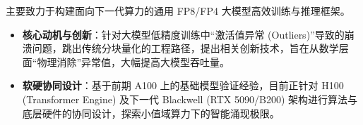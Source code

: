 \documentclass[10pt]{resume}
\begin{document}
\small{
主要致力于构建面向下一代算力的通用 FP8/FP4 大模型高效训练与推理框架。
\begin{itemize}[leftmargin=*, parsep=0.5ex]
\item \textbf{核心动机与创新}：针对大模型低精度训练中“激活值异常 (Outliers)”导致的崩溃问题，跳出传统分块量化的工程路径，提出相关创新技术，旨在从数学层面“物理消除”异常值，大幅提高大模型吞吐量。
\item \textbf{软硬协同设计}：基于前期 A100 上的基础模型验证经验，目前正针对 H100 (Transformer Engine) 及下一代 Blackwell (RTX 5090/B200) 架构进行算法与底层硬件的协同设计，探索小值域算力下的智能涌现极限。

\end{itemize}
}
\end{document}
